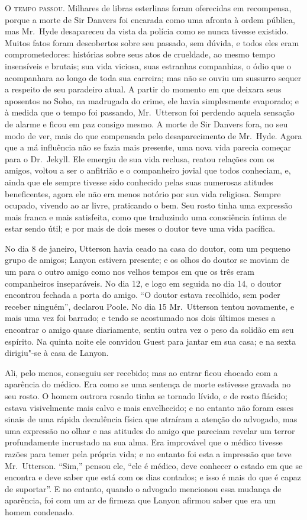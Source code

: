 \textsc{O tempo passou.}  Milhares de libras esterlinas foram oferecidas em
recompensa, porque a morte de Sir Danvers foi encarada como uma afronta
à ordem pública, mas Mr.~Hyde desapareceu da vista da polícia como se
nunca tivesse existido.  Muitos fatos foram descobertos sobre seu
passado, sem dúvida, e todos eles eram comprometedores: histórias sobre
seus atos de crueldade, ao mesmo tempo insensíveis e brutais; sua vida
viciosa, suas estranhas companhias, o ódio que o acompanhara ao longo
de toda sua carreira; mas não se ouviu um sussurro sequer a respeito de
seu paradeiro atual.  A partir do momento em que deixara seus aposentos
no Soho, na madrugada do crime, ele havia simplesmente evaporado; e
à medida que o tempo foi passando, Mr.~Utterson foi perdendo aquela
sensação de alarme e ficou em paz consigo mesmo.  A morte de Sir
Danvers fora, no seu modo de ver, mais do que compensada pelo
desaparecimento de Mr.~Hyde.  Agora que a má influência não se fazia
mais presente, uma nova vida parecia começar para o Dr.~Jekyll. Ele
emergiu de sua vida reclusa, reatou relações com os amigos, voltou a
ser o anfitrião e o companheiro jovial que todos conheciam, e, ainda
que ele sempre tivesse sido conhecido pelas suas numerosas atitudes
beneficentes, agora ele não era menos notório por sua vida religiosa. 
Sempre ocupado, vivendo ao ar livre, praticando o bem.  Seu rosto tinha
uma expressão mais franca e mais satisfeita, como que traduzindo uma
consciência íntima de estar sendo útil; e por mais de dois meses o
doutor teve uma vida pacífica.

No dia 8 de janeiro, Utterson havia ceado na casa do doutor, com
um pequeno grupo de amigos; Lanyon estivera presente; e os olhos do
doutor se moviam de um para o outro amigo como nos velhos tempos em que
os três eram companheiros inseparáveis.  No dia 12, e logo em seguida
no dia 14, o doutor encontrou fechada a porta do amigo.  “O doutor
estava recolhido, sem poder receber ninguém”, declarou Poole.  No dia
15 Mr.~Utterson tentou novamente, e mais uma vez foi barrado; e tendo
se acostumado nos dois últimos meses a encontrar o amigo quase
diariamente, sentiu outra vez o peso da solidão em seu espírito.  Na
quinta noite ele convidou Guest para jantar em sua casa; e na sexta
dirigiu"-se à casa de Lanyon.

Ali, pelo menos, conseguiu ser recebido; mas ao entrar ficou chocado com
a aparência do médico.  Era como se uma sentença de morte estivesse
gravada no seu rosto.  O homem outrora rosado tinha se tornado lívido,
e de rosto flácido; estava visivelmente mais calvo e mais envelhecido;
e no entanto não foram esses sinais de uma rápida decadência física que
atraíram a atenção do advogado, mas uma expressão no olhar e nas
atitudes do amigo que pareciam revelar um terror profundamente
incrustado na sua alma.  Era improvável que o médico tivesse razões
para temer pela própria vida; e no entanto foi esta a impressão que
teve Mr.~Utterson.  “Sim,” pensou ele, “ele é médico, deve conhecer o
estado em que se encontra e deve saber que está com os dias contados; e
isso é mais do que é capaz de suportar”.  E no entanto, quando o
advogado mencionou essa mudança de aparência, foi com um ar de firmeza
que Lanyon afirmou saber que era um homem condenado.

